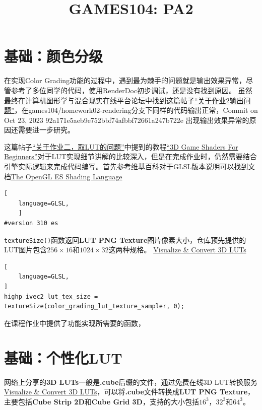 \documentclass{ctexart}
\title{GAMES104: PA2}
\begin{document}
	
	\maketitle
	
	\section{基础：颜色分级} \label{section:basic1}
	在实现Color Grading功能的过程中，遇到最为棘手的问题就是输出效果异常，尽管参考了多位同学的代码，使用RenderDoc初步调试，还是没有找到原因。
	虽然最终在计算机图形学与混合现实在线平台论坛中找到这篇帖子\href{https://games-cn.org/forums/topic/guanyuzuoye2shuchuwenti/}{“关于作业2输出问题”}，在games104/homework02-rendering分支下同样的代码输出正常，Commit on Oct 23, 2023 92a171e5aeb9e752bbf74afbbf72661a247b722e 出现输出效果异常的原因还需要进一步研究。
	
	这篇帖子\href{https://games-cn.org/forums/topic/guanyuzuoyeerqulutdewenti/}{“关于作业二，取LUT的问题”}中提到的教程\href{https://games-cn.org/forums/topic/guanyuzuoyeerqulutdewenti/}{“3D Game Shaders For Beginners”}对于LUT实现细节讲解的比较深入，但是在完成作业时，仍然需要结合引擎实际逻辑来完成代码编写。首先参考\href{https://en.wikipedia.org/wiki/OpenGL_Shading_Language}{维基百科}对于GLSL版本说明可以找到文档\href{https://registry.khronos.org/OpenGL/specs/es/3.1/GLSL_ES_Specification_3.10.withchanges.pdf}{The OpenGL ES Shading Language}	
\begin{lstlisting}[
	language=GLSL,
	]
#version 310 es
\end{lstlisting}
	\verb|textureSize()|函数返回\textbf{LUT PNG Texture}图片像素大小，仓库预先提供的LUT图片包含$ 256\times16 $和$ 1024\times32 $这两种规格。
	\href{https://www.color.io/free-online-lut-converter}{Visualize \& Convert 3D LUTs}
\begin{lstlisting}[
	language=GLSL,
]
highp ivec2 lut_tex_size = textureSize(color_grading_lut_texture_sampler, 0);
\end{lstlisting}
    在课程作业中提供了功能实现所需要的函数，
	
	
	\section{基础：个性化LUT} \label{section:basic2}
	网络上分享的\textbf{3D LUTs}一般是\textbf{.cube}后缀的文件，通过免费在线3D LUT转换服务\href{https://www.color.io/free-online-lut-converter}{Visualize \& Convert 3D LUTs}，可以将\textbf{.cube}文件转换成\textbf{LUT PNG Texture}，主要包括\textbf{Cube Strip 2D}和\textbf{Cube Grid 3D}，支持的大小包括$ 16^3 $，$ 32^3 $和$ 64^3 $。
    
\end{document}
